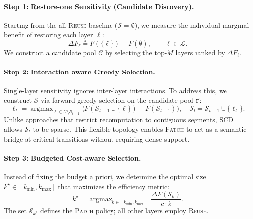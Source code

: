 \documentclass{article}
\theoremstyle{plain}
\theoremstyle{definition}
\theoremstyle{remark}
\begin{document}
\paragraph{Step 1: Restore-one Sensitivity (Candidate Discovery).}
Starting from the all-\textsc{Reuse} baseline ($\mathcal{S}=\emptyset$), we measure the individual marginal benefit of restoring each layer $\ell$:
\begin{equation}
\Delta F_{\ell} \triangleq F(\{\ell\}) - F(\emptyset), \qquad \ell \in \mathcal{L}.
\label{eq:restore_one_method}
\end{equation}
We construct a candidate pool $\mathcal{C}$ by selecting the top-$M$ layers ranked by $\Delta F_{\ell}$.

\paragraph{Step 2: Interaction-aware Greedy Selection.}
Single-layer sensitivity ignores inter-layer interactions. To address this, we construct $\mathcal{S}$ via forward greedy selection on the candidate pool $\mathcal{C}$:
\begin{equation}
\label{eq:greedy_method}
\ell_t = \mathop{\arg\max}_{\ell \in \mathcal{C} \setminus \mathcal{S}_{t-1}}
\Big( F(\mathcal{S}_{t-1} \cup \{\ell\}) - F(\mathcal{S}_{t-1}) \Big),
\quad
\mathcal{S}_t = \mathcal{S}_{t-1} \cup \{\ell_t\}.
\end{equation}
Unlike approaches that restrict recomputation to contiguous segments, SCD allows $\mathcal{S}_t$ to be sparse. This flexible topology enables \textsc{Patch} to act as a semantic bridge at critical transitions without requiring dense support.

\paragraph{Step 3: Budgeted Cost-aware Selection.}
Instead of fixing the budget a priori, we determine the optimal size $k^\star \in [k_{\min}, k_{\max}]$ that maximizes the efficiency metric:
\begin{equation}
k^\star = \mathop{\arg\max}_{k \in [k_{\min}, k_{\max}]} \;
\frac{\Delta F(\mathcal{S}_k)}{c \cdot k}.
\label{eq:kstar_method}
\end{equation}
The set $\mathcal{S}_{k^\star}$ defines the \textsc{Patch} policy; all other layers employ \textsc{Reuse}.
\end{document}
